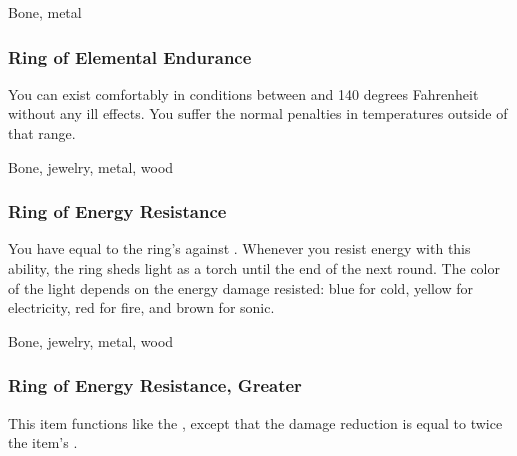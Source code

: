  


 Bone, metal


\lowercase{\hypertarget{item:Ring of Elemental Endurance}{}}\label{item:Ring of Elemental Endurance}
\hypertarget{item:Ring of Elemental Endurance}{\subsubsection{Ring of Elemental Endurance\hfill{}}}

You can exist comfortably in conditions between  and 140 degrees Fahrenheit without any ill effects.
You suffer the normal penalties in temperatures outside of that range.



 


 Bone, jewelry, metal, wood


\lowercase{\hypertarget{item:Ring of Energy Resistance}{}}\label{item:Ring of Energy Resistance}
\hypertarget{item:Ring of Energy Resistance}{\subsubsection{Ring of Energy Resistance\hfill{}}}

You have  equal to the ring's  against .
Whenever you resist energy with this ability, the ring sheds light as a torch until the end of the next round.
The color of the light depends on the energy damage resisted: blue for cold, yellow for electricity, red for fire, and brown for sonic.



 


 Bone, jewelry, metal, wood


\lowercase{\hypertarget{item:Ring of Energy Resistance, Greater}{}}\label{item:Ring of Energy Resistance, Greater}
\hypertarget{item:Ring of Energy Resistance, Greater}{\subsubsection{Ring of Energy Resistance, Greater\hfill{}}}

This item functions like the , except that the damage reduction is equal to twice the item's .



